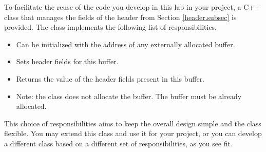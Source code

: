\documentclass[12pt]{book}
\begin{document}
To facilitate the reuse of the code you develop in this lab in your project, a C++ class that manages the fields of the header from Section \ref{header.subsec} is provided. The class implements the following list of responsibilities.
\begin{itemize}[label=--]
\item Can be initialized with the address of any externally allocated buffer.
\item Sets header fields for this buffer.
\item Returns the value of the header fields present in this buffer.
\item Note: the class does not allocate the buffer. The buffer must be already allocated.
\end{itemize}

This choice of responsibilities aims to keep the overall design simple and the class flexible. 
You may extend this class and use it for your project, or you can develop a different class based on a different set of responsibilities, as you see fit.
\end{document}
